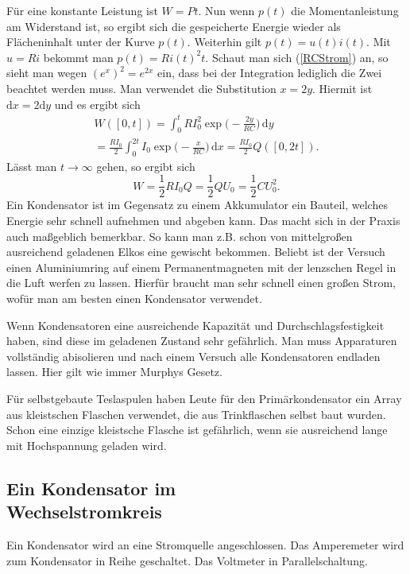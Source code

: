 \documentclass[a4paper,10pt,fleqn,twocolumn,twoside]{article}
\numberwithin{equation}{section}
\begin{document}
Für eine konstante Leistung ist $W=Pt$. Nun wenn $p(t)$ die
Momentanleistung am Widerstand ist, so ergibt sich die gespeicherte
Energie wieder als Flächeninhalt unter der Kurve $p(t)$.
Weiterhin gilt $p(t)=u(t)i(t)$. Mit $u=Ri$ bekommt man
$p(t)=Ri(t)^2 t$. Schaut man sich (\ref{RCStrom}) an, so sieht man
wegen $(e^x)^2=e^{2x}$ ein, dass bei der Integration lediglich
die Zwei beachtet werden muss. Man verwendet die Substitution
$x=2y$. Hiermit ist $\mathrm dx=2\mathrm dy$ und es ergibt sich
\begin{gather*}
W([0,t]) = \int_0^t RI_0^2 \exp\Big(-\frac{2y}{RC}\Big)\,\mathrm dy\\
= \frac{RI_0}{2}\int_0^{2t} I_0 \exp\Big(-\frac{x}{RC}\Big)\,\mathrm dx
= \frac{RI_0}{2}Q([0,2t]).
\end{gather*}
Lässt man $t\rightarrow\infty$ gehen, so ergibt sich
\begin{equation}
W = \frac{1}{2}RI_0Q = \frac{1}{2}QU_0 = \frac{1}{2}CU_0^2.
\end{equation}
Ein Kondensator ist im Gegensatz zu einem Akkumulator ein Bauteil,
welches Energie sehr schnell aufnehmen und abgeben kann. Das macht
sich in der Praxis auch maßgeblich bemerkbar. So kann man z.B. schon
von mittelgroßen ausreichend geladenen Elkos eine gewischt bekommen.
Beliebt ist der Versuch einen Aluminiumring auf einem
Permanentmagneten mit der lenzschen Regel in die Luft werfen zu
lassen. Hierfür braucht man sehr schnell einen großen Strom, wofür
man am besten einen Kondensator verwendet.

Wenn Kondensatoren eine ausreichende Kapazität und
Durchschlagsfestigkeit haben, sind diese im geladenen Zustand
sehr gefährlich. Man muss Apparaturen vollständig abisolieren
und nach einem Versuch alle Kondensatoren endladen lassen.
Hier gilt wie immer Murphys Gesetz.

Für selbstgebaute Teslaspulen haben Leute für den Primärkondensator
ein Array aus kleistschen Flaschen verwendet, die aus Trinkflaschen
selbst baut wurden. Schon eine einzige kleistsche Flasche ist
gefährlich, wenn sie ausreichend lange mit Hochspannung geladen wird.


\subsection[Ein Kondensator im Wechselstromkreis]
{Ein Kondensator im\\
Wechselstromkreis}

Ein Kondensator wird an eine Stromquelle angeschlossen.
Das Amperemeter wird zum Kondensator in Reihe geschaltet.
Das Voltmeter in Parallelschaltung.
\end{document}
